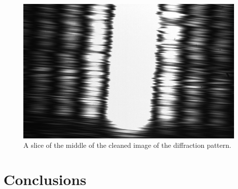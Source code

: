 \documentclass{emulateapj}
\begin{document}
\begin{figure}[H]
\centering
\includegraphics[scale=0.2]{corrected_image_fov.png}
\caption{A slice of the middle of the cleaned image of the diffraction pattern.}
\label{img:slice}
\end{figure}






\section{Conclusions}
\label{sec:conclusions}
\end{document}
